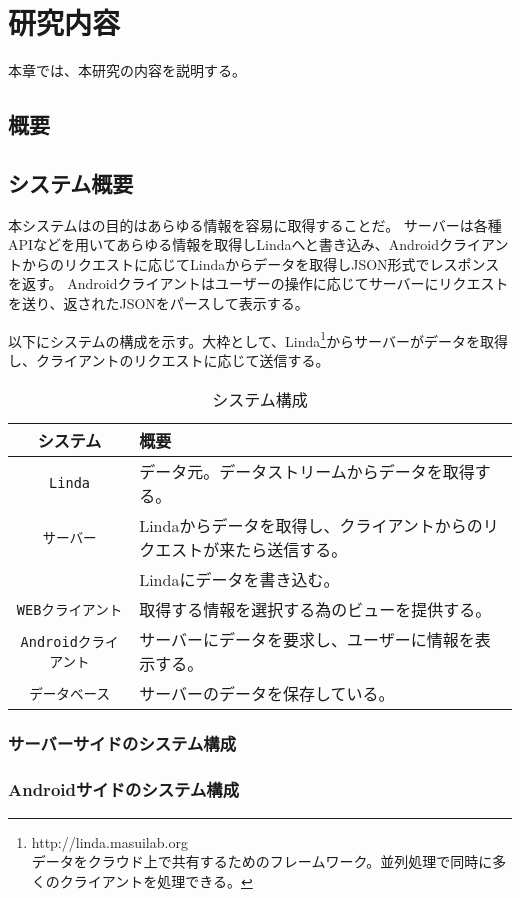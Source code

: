 \chapter{研究内容}
\label{chap:contents}

本章では、本研究の内容を説明する。
\section{概要}

\section{システム概要}

本システムはの目的はあらゆる情報を容易に取得することだ。
サーバーは各種APIなどを用いてあらゆる情報を取得しLindaへと書き込み、Androidクライアントからのリクエストに応じてLindaからデータを取得しJSON形式でレスポンスを返す。
Androidクライアントはユーザーの操作に応じてサーバーにリクエストを送り、返されたJSONをパースして表示する。

以下にシステムの構成を示す。大枠として、Linda\footnote{http://linda.masuilab.org\\データをクラウド上で共有するためのフレームワーク。並列処理で同時に多くのクライアントを処理できる。}からサーバーがデータを取得し、クライアントのリクエストに応じて送信する。

\begin{table}[htbp]
  \caption{システム構成}
  \label{tb:files}
  \begin{center}\begin{tabular}{c|l}
    \hline
    システム&概要\\\hline\hline
    {\tt Linda}&データ元。データストリームからデータを取得する。\\\hline
    {\tt サーバー}&Lindaからデータを取得し、クライアントからのリクエストが来たら送信する。\\
                      &Lindaにデータを書き込む。\\\hline
    {\tt WEBクライアント}&取得する情報を選択する為のビューを提供する。\\\hline
    {\tt Androidクライアント}&サーバーにデータを要求し、ユーザーに情報を表示する。\\\hline
    {\tt データベース}&サーバーのデータを保存している。\\\hline
  \end{tabular}\end{center}
\end{table}

\subsection{サーバーサイドのシステム構成}

\subsection{Androidサイドのシステム構成}

\nocite{*}
